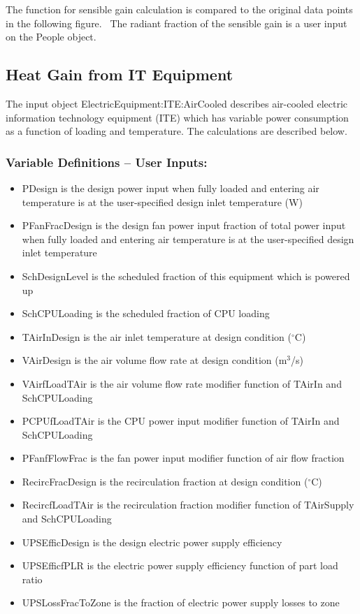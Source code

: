 The function for sensible gain calculation is compared to the original data points in the following figure.~ The radiant fraction of the sensible gain is a user input on the People object.

\subsection{Heat Gain from IT Equipment}\label{heat-gain-from-it-equipment}

The input object ElectricEquipment:ITE:AirCooled describes air-cooled electric information technology equipment (ITE) which has variable power consumption as a function of loading and temperature. The calculations are described below.

\subsubsection{Variable Definitions -- User Inputs:}\label{variable-definitions-user-inputs}

\begin{itemize}
\tightlist
\item
  PDesign is the design power input when fully loaded and entering air temperature is at the user-specified design inlet temperature (W)
\item
  PFanFracDesign is the design fan power input fraction of total power input when fully loaded and entering air temperature is at the user-specified design inlet temperature
\item
  SchDesignLevel is the scheduled fraction of this equipment which is powered up
\item
  SchCPULoading is the scheduled fraction of CPU loading
\item
  TAirInDesign is the air inlet temperature at design condition ($^\circ$C)
\item
  VAirDesign is the air volume flow rate at design condition (m$^3$/s)
\item
  VAirfLoadTAir is the air volume flow rate modifier function of TAirIn and SchCPULoading
\item
  PCPUfLoadTAir is the CPU power input modifier function of TAirIn and SchCPULoading
\item
  PFanfFlowFrac is the fan power input modifier function of air flow fraction
\item
  RecircFracDesign is the recirculation fraction at design condition ($^\circ$C)
\item
  RecircfLoadTAir is the recirculation fraction modifier function of TAirSupply and SchCPULoading
\item
  UPSEfficDesign is the design electric power supply efficiency
\item
  UPSEfficfPLR is the electric power supply efficiency function of part load ratio
\item
  UPSLossFracToZone is the fraction of electric power supply losses to zone
\end{itemize}

